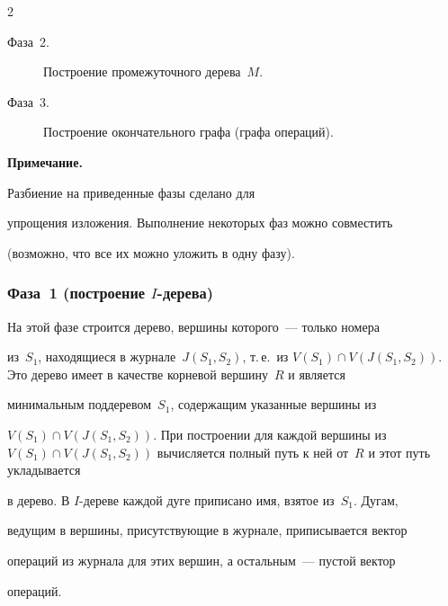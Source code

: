 \begin{multicols}{2}
\begin{description}
\item[Фаза~2.] Построение промежуточного дерева~$M$.


\item[Фаза~3.] Построение окончательного графа (графа операций).


\end{description}





\smallskip





\noindent


{\sf \textbf{Примечание.} 


Разбиение на приведенные фазы сделано для 


упрощения изложения. Выполнение некоторых фаз можно совместить 


(возможно, что все их можно уложить в одну фазу).}





\vspace*{-3pt}


\subsubsection{Фаза~1 (построение $I$-дерева)} %





      На этой фазе строится дерево, вершины которого~--- только номера 


из~$S_1$, находящиеся в журнале~$J(S_1, S_2)$, т.\,е.\ из $V(S_1)\cap V(J(S_1, 


S_2))$. Это дерево имеет в качестве корневой вершину~$R$ и является 


минимальным поддеревом~$S_1$, содержащим указанные вершины из 


$V(S_1)\cap V(J(S_1, S_2))$. При построении для каждой вершины из $V(S_1)\cap 


V(J(S_1, S_2))$ вычисляется полный путь к ней от~$R$ и этот путь укладывается 


в дерево. В $I$-дереве каждой дуге приписано имя, взятое из~$S_1$. Дугам, 


ведущим в вершины, присутствующие в журнале, приписывается вектор 


операций из журнала для этих вершин, а остальным~--- пустой вектор 


операций.






\end{multicols}
